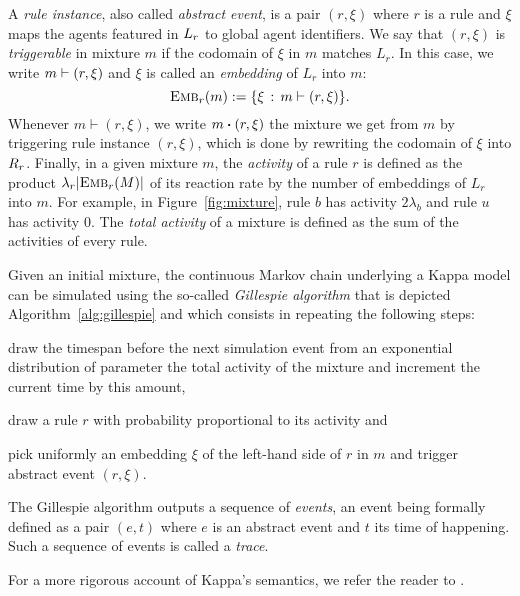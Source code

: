 A \emph{rule instance}, also called \emph{abstract event}, is a pair
$(r, \xi)$ where $r$ is a rule and $\xi$ maps the agents featured in
$L_{r}$ to global agent identifiers. We say that $(r, \xi)$ is
\emph{triggerable} in mixture $m$ if the codomain of $\xi$ in $m$
matches $L_r$. In this case, we write $m \vdash (r, \xi)$ and
$\xi$ is called an \emph{embedding} of $L_r$ into $m$:
\[{\textsc{Emb}}_{r}(m) := \{ \xi \,:\, m \vdash (r, \xi)\}.\]
Whenever $m \vdash (r, \xi)$, we write $\UPDATE{m}{(r, \xi)}$ the
mixture we get from $m$ by triggering rule instance $(r, \xi)$, which
is done by rewriting the codomain of $\xi$ into $R_{r}$.  Finally,
in a given mixture $m$, the \emph{activity} of a rule $r$ is defined
as the product $\lambda_r|{\textsc{Emb}}_{r}(M)|$ of its reaction rate by the
number of embeddings of $L_r$ into $m$. For example, in
Figure~\ref{fig:mixture}, rule $b$ has activity $2\lambda_b$ and rule
$u$ has activity $0$. The \emph{total activity} of a mixture is
defined as the sum of the activities of every rule.

Given an initial mixture, the continuous Markov chain underlying a
Kappa model can be simulated using the so-called \emph{Gillespie
  algorithm} \cite{DanosEtAl-APLAS07} that is depicted
Algorithm~\ref{alg:gillespie} and which consists in repeating the
following steps:
\begin{inparaenum}[(1)]
\item draw the timespan before the next simulation event from an
  exponential distribution of parameter the total activity of the
  mixture and increment the current time by this amount,
\item draw a rule $r$ with probability proportional to its activity and
\item pick uniformly an embedding $\xi$ of the left-hand side of $r$ in $m$
and trigger abstract event $(r, \xi)$.
\end{inparaenum}
The Gillespie algorithm outputs a sequence of \emph{events}, an event
being formally defined as a pair $(e, t)$ where $e$ is an abstract
event and $t$ its time of happening. Such a sequence of events is
called a \emph{trace}.



\noindent For a more rigorous account of Kappa's semantics, we refer
the reader to \cite{}.





